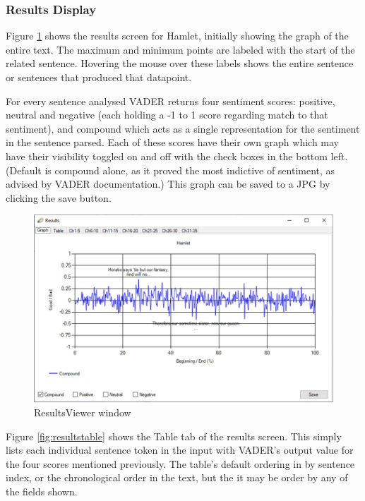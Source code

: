 \documentclass{article}
\begin{document}
    \subsubsection{Results Display}
        Figure \ref{fig:resultsviewer} shows the results screen for Hamlet, initially showing the graph of the entire text. The maximum and minimum points are labeled with the start of the related sentence. Hovering the mouse over these labels shows the entire sentence or sentences that produced that datapoint.

        For every sentence analysed VADER returns four sentiment scores: positive, neutral and negative (each holding a -1 to 1 score regarding match to that sentiment), and compound which acts as a single representation for the sentiment in the sentence parsed. Each of these scores have their own graph which may have their visibility toggled on and off with the check boxes in the bottom left. (Default is compound alone, as it proved the most indictive of sentiment, as advised by VADER documentation.) This graph can be saved to a JPG by clicking the save button.
        \begin{figure}[H]
            \includegraphics[width=1\textwidth]{Misc/resultsviewer}
            \caption{ResultsViewer window}
            \label{fig:resultsviewer}
        \end{figure}
        Figure \ref{fig:resultstable} shows the Table tab of the results screen. This simply lists each individual sentence token in the input with VADER’s output value for the four scores mentioned previously. The table’s default ordering in by sentence index, or the chronological order in the text, but the it may be order by any of the fields shown.
\end{document}
